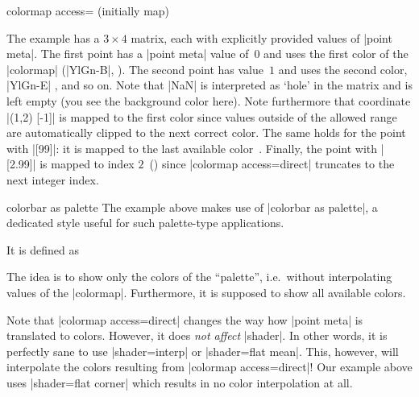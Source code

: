 \begin{pgfplotskey}{colormap access= (initially map)}
\begin{codeexample}[]
\end{codeexample}
	The example has a $3\times 4$ matrix, each with explicitly provided values of |point meta|. The first point has a |point meta| value of~$0$ and uses the first color of the |colormap| (|YlGn-B|, ). The second point has value~$1$ and uses the second color, |YlGn-E| , and so on. Note that |NaN| is interpreted as `hole' in the matrix and is left empty (you see the background color here). Note furthermore that coordinate |(1,2) [-1]| is mapped to the first color since values outside of the allowed range are automatically clipped to the next correct color. The same holds for the point with |[99]|: it is mapped to the last available color~. Finally, the point with |[2.99]| is mapped to index $2$~() since |colormap access=direct| truncates to the next integer index.

\begin{pgfplotskey}{colorbar as palette}
	The example above makes use of |colorbar as palette|, a dedicated style useful for such palette-type applications.

	It is defined as
\begin{codeexample}
\end{codeexample}
	The idea is to show only the colors of the ``palette'', i.e.\ without interpolating values of the |colormap|. Furthermore, it is supposed to show all available colors.
\end{pgfplotskey}

	Note that |colormap access=direct| changes the way how |point meta| is translated to colors. However, it does \emph{not affect} |shader|. In other words, it is perfectly sane to use |shader=interp| or |shader=flat mean|. This, however, will interpolate the colors resulting from |colormap access=direct|! Our example above uses |shader=flat corner| which results in no color interpolation at all.


\end{pgfplotskey}
